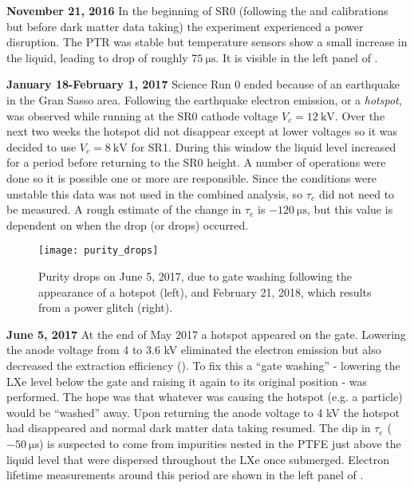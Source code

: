 \textbf{November 21, 2016}  In the beginning of SR0 (following the \ambe and \metakr calibrations but before dark matter data taking) the
experiment experienced a power disruption.  The PTR was stable but temperature sensors show a small increase in the
liquid, leading to drop of roughly $75\ \mathrm{\mu s}$.  It is visible in the left panel of
.

\textbf{January 18-February 1, 2017} Science Run 0 ended because of an earthquake in the Gran Sasso area.  Following the earthquake
electron emission, or a \textit{hotspot}, was observed while running at the SR0 cathode voltage $V_c = 12\ \mathrm{kV}$.  Over the next two
weeks the hotspot did not disappear except at lower voltages so it was decided to use $V_c = 8\ \mathrm{kV}$ for SR1.  During this window
the liquid level increased for a period before returning to the SR0 height.  A number of operations were done so it is possible one or more
are responsible.  Since the conditions were unstable this data was not used in the
combined analysis, so $\tau_e$ did not need to be measured.  A rough estimate of the change in $\tau_e$ is $-120\ \mathrm{\mu s}$, but this
value is dependent on when the drop (or drops) occurred.

\begin{figure}
\centering
\texttt{[image: purity\_drops]}
\caption{Purity drops on June 5, 2017, due to gate washing following the appearance of a hotspot (left), and February 21, 2018, which results
from a power glitch (right).}
\label{fig:electron_lifetime_model_detector_effects_spikes_examples}
\end{figure}

\textbf{June 5, 2017}  At the end of May 2017 a hotspot appeared on the gate.  Lowering the anode voltage from 4 to 3.6 kV eliminated the
electron emission but also decreased the extraction efficiency ().  To fix this
a ``gate washing'' - lowering the LXe level below the gate and raising it again to its original position - was performed.  The hope was that
whatever was causing the hotspot (e.g. a particle) would be ``washed''
away.  Upon returning the anode voltage to 4 kV the hotspot had disappeared and normal dark matter data taking resumed.  The dip in
$\tau_e$ ($-50\ \mathrm{\mu s}$) is suspected to come from impurities nested in the PTFE just above the liquid level that were dispersed
throughout the LXe once submerged.  Electron lifetime measurements around this period are shown in the left panel of
.

